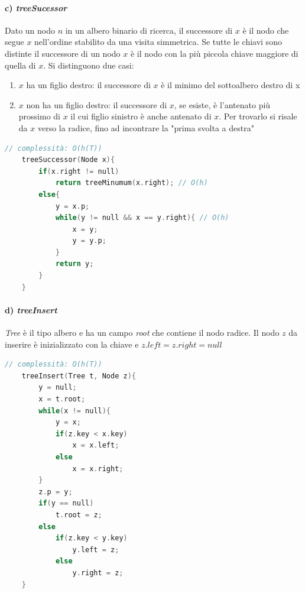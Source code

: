 \documentclass[italian]{article}
\begin{document}
\paragraph{c) \textit{treeSucessor}} Dato un nodo $n$ in un albero binario di ricerca, il successore di $x$ è il nodo che segue $x$ nell'ordine stabilito da una visita simmetrica. Se tutte le chiavi sono distinte il successore di un nodo $x$ è il nodo con la più piccola chiave maggiore di quella di $x$. Si distinguono due casi:
\begin{enumerate}[itemsep=0pt,label=\arabic*)]
	\item $x$ ha un figlio destro: il successore di $x$ è il minimo del sottoalbero destro di x
	\item $x$ non ha un figlio destro: il successore di $x$, se esiste, è l'antenato più prossimo di $x$ il cui figlio sinistro è anche antenato di $x$. Per trovarlo si risale da $x$ verso la radice, fino ad incontrare la "prima svolta a destra"
\end{enumerate}

\begin{lstlisting}[language=c,mathescape=true]
	// complessità: O(h(T))
	treeSuccessor(Node x){
		if(x.right != null)
			return treeMinumum(x.right); // O(h)
		else{
			y = x.p;
			while(y != null && x == y.right){ // O(h)
				x = y;
				y = y.p;
			}
			return y;
		}
	}
\end{lstlisting}
\paragraph{d) \textit{treeInsert}} \textit{Tree} è il tipo albero e ha un campo \textit{root} che contiene il nodo radice. Il nodo $z$ da inserire è inizializzato con la chiave e $z.left = z.right = null$
\begin{lstlisting}[language=c,mathescape=true]
	// complessità: O(h(T))
	treeInsert(Tree t, Node z){
		y = null;
		x = t.root;
		while(x != null){
			y = x;
			if(z.key < x.key)
				x = x.left;
			else
				x = x.right;
		}
		z.p = y;
		if(y == null)
			t.root = z;
		else
			if(z.key < y.key)
				y.left = z;
			else
				y.right = z;
	}
\end{lstlisting}
\end{document}
